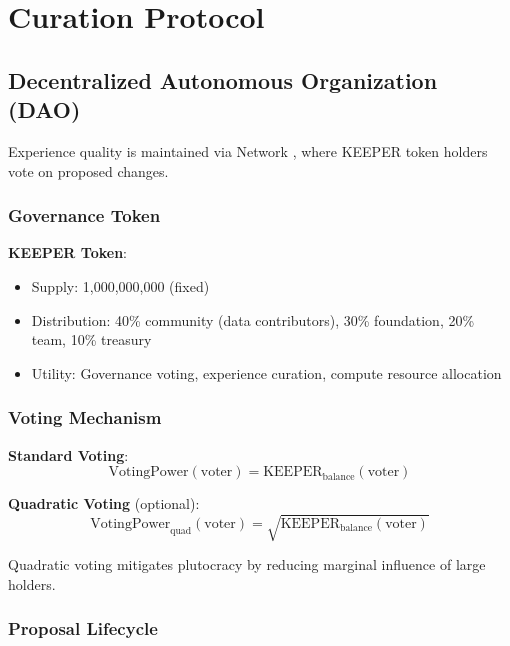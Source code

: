 \section{Curation Protocol}

\label{sec:curation}

\subsection{Decentralized Autonomous Organization (DAO)}

Experience quality is maintained via \Zoo{} Network \DAO{}, where KEEPER token holders vote on proposed changes.

\subsubsection{Governance Token}

\textbf{KEEPER Token}:
\begin{itemize}
    \item Supply: 1,000,000,000 (fixed)
    \item Distribution: 40\% community (data contributors), 30\% foundation, 20\% team, 10\% treasury
    \item Utility: Governance voting, experience curation, compute resource allocation
\end{itemize}

\subsubsection{Voting Mechanism}

\textbf{Standard Voting}:
\begin{equation}
\text{VotingPower}(\text{voter}) = \text{KEEPER}_{\text{balance}}(\text{voter})
\end{equation}

\textbf{Quadratic Voting} (optional):
\begin{equation}
\text{VotingPower}_{\text{quad}}(\text{voter}) = \sqrt{\text{KEEPER}_{\text{balance}}(\text{voter})}
\end{equation}

Quadratic voting mitigates plutocracy by reducing marginal influence of large holders.

\subsubsection{Proposal Lifecycle}

